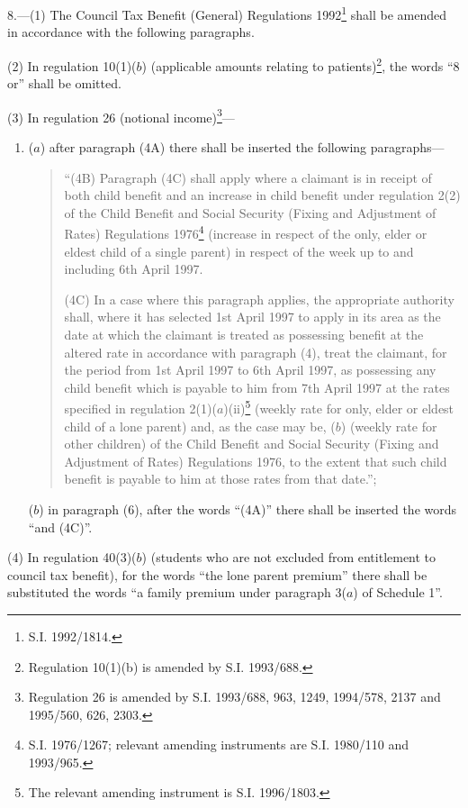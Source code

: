 \documentclass[a4paper]{article}
\newcommand\fnote[1]{\footnote{\frenchspacing #1}}
\begin{document}
8.---(1) The Council Tax Benefit (General) Regulations 1992\fnote{S.I. 1992/1814.} shall be amended in accordance with the following paragraphs.

(2)  In regulation 10(1)($b$) (applicable amounts relating to patients)\footnote{\frenchspacing Regulation 10(1)(b) is amended by S.I. 1993/688.}, the words “8 or” shall be omitted.

(3) In regulation 26 (notional income)\footnote{\frenchspacing Regulation 26 is amended by S.I. 1993/688, 963, 1249, 1994/578, 2137 and 1995/560, 626, 2303.}---

\begin{enumerate}\item[]
($a$) after paragraph (4A) there shall be inserted the following paragraphs—
\begin{quotation}
“(4B) Paragraph (4C) shall apply where a claimant is in receipt of both child benefit and an increase in child benefit under regulation 2(2) of the Child Benefit and Social Security (Fixing and Adjustment of Rates) Regulations 1976\footnote{\frenchspacing S.I. 1976/1267; relevant amending instruments are S.I. 1980/110 and 1993/965.} (increase in respect of the only, elder or eldest child of a single parent) in respect of the week up to and including 6th April 1997.

(4C) In a case where this paragraph applies, the appropriate authority shall, where it has selected 1st April 1997 to apply in its area as the date at which the claimant is treated as possessing benefit at the altered rate in accordance with paragraph (4), treat the claimant, for the period from 1st April 1997 to 6th April 1997, as possessing any child benefit which is payable to him from 7th April 1997 at the rates specified in regulation 2(1)($a$)(ii)\footnote{\frenchspacing The relevant amending instrument is S.I. 1996/1803.} (weekly rate for only, elder or eldest child of a lone parent) and, as the case may be, ($b$) (weekly rate for other children) of the Child Benefit and Social Security (Fixing and Adjustment of Rates) Regulations 1976, to the extent that such child benefit is payable to him at those rates from that date.”;
\end{quotation}

($b$) in paragraph (6), after the words “(4A)” there shall be inserted the words “and (4C)”.
\end{enumerate}

(4)  In regulation 40(3)($b$) (students who are not excluded from entitlement to council tax benefit), for the words “the lone parent premium” there shall be substituted the words “a family premium under paragraph 3($a$) of Schedule 1”.
\end{document}
